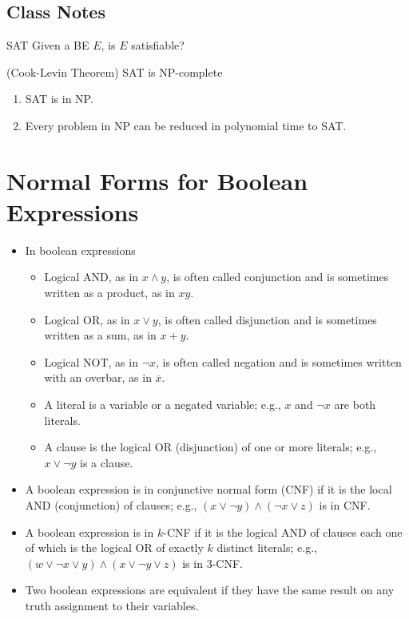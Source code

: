 \documentclass[]{article}
\begin{document}
\subsection*{Class Notes}
SAT
Given a BE $E$, is $E$ satisfiable?
\begin{thm}
(Cook-Levin Theorem) SAT is NP-complete
\end{thm}
\begin{enumerate}
\item SAT is in NP.
\item Every problem in NP can be reduced in polynomial time to SAT.
\end{enumerate}

\section{Normal Forms for Boolean Expressions}
\begin{itemize}
\item In boolean expressions
\begin{itemize}
\item Logical AND, as in $x \wedge y$, is often called conjunction and is
sometimes written as a product, as in $xy$.
\item Logical OR, as in $x \vee y$, is often called disjunction and is sometimes
written as a sum, as in $x + y$.
\item Logical NOT, as in $\neg x$, is often called negation and is sometimes
written with an overbar, as in $\overline{x}$.
\item A literal is a variable or a negated variable; e.g., $x$ and $\neg x$ are
both literals.
\item A clause is the logical OR (disjunction) of one or more literals; e.g., $x
\vee \neg y$ is a clause.
\end{itemize}
\item A boolean expression is in conjunctive normal form (CNF) if it is the
local AND (conjunction) of clauses; e.g., $(x \vee \neg y) \wedge (\neg x \vee
z)$ is in CNF.
\item A boolean expression is in $k$-CNF if it is the logical AND of clauses
each one of which is the logical OR of exactly $k$ distinct literals; e.g., $(w
\vee \neg x \vee y) \wedge (x \vee \neg y \vee z)$ is in 3-CNF.
\item Two boolean expressions are equivalent if they have the same result on any
truth assignment to their variables.
\end{itemize}
\end{document}
